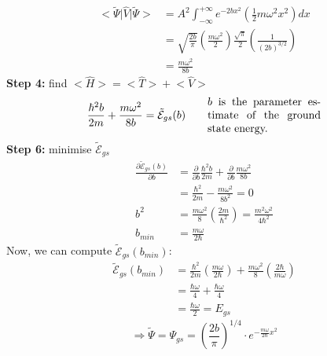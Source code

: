 \documentclass[12pt,fancychapters]{report}
\numberwithin{equation}{section}
\begin{document}
\begin{align*}
  \big<\tilde{\Psi}\big|\hat{V}\big|\tilde{\Psi}\big> &= A^2\int_{-\infty}^{+\infty}
  e^{-2bx^2}\left(\frac{1}{2} m \omega^2x^2\right)dx\\
  &= \sqrt{\frac{2b}{\pi}}\left(\frac{m\omega^2}{2}\right)\frac{\sqrt{\pi}}{2}
  \left(\frac{1}{(2b)^{3/2}}\right)\\
  &= \frac{m\omega^2}{8b}
\end{align*}
\textbf{Step 4:} find $\big<\hat{H}\big> = \big<\hat{T}\big>+\big<\hat{V}\big>$
\[
  \frac{\hbar^2 b}{2m} + \frac{m\omega^2}{8b} = \tilde{\mathcal{E}}_{gs}(b)\qquad
  \parbox{0.3\textwidth}{$b$ is the parameter estimate of the ground state energy.}
\]
\textbf{Step 6:} minimise $\tilde{\mathcal{E}}_{gs}$
\begin{align*}
  \frac{\partial \tilde{\mathcal{E}}_{gs}(b)}{\partial b} &= \frac{\partial}{\partial b}
  \frac{\hbar^2 b}{2m} + \frac{\partial }{\partial b}\frac{m\omega^2}{8b}\\
  &= \frac{\hbar^2}{2m} - \frac{m\omega^2}{8b^2} = 0\\
  b^2 &= \frac{m\omega^2}{8}\left(\frac{2m}{\hbar^2}\right) = \frac{m^2\omega^2}{4\hbar^2}\\
  b_{min} &= \frac{m\omega}{2\hbar}
\end{align*}
Now, we can compute $\tilde{\mathcal{E}}_{gs}(b_{min})$:
\begin{align*}
  \tilde{\mathcal{E}}_{gs}(b_{min})&= \frac{\hbar^2}{2m}\left(\frac{m\omega}{2\hbar}\right)
  + \frac{m\omega^2}{8}\left(\frac{2\hbar}{m\omega}\right)\\
                                   &= \frac{\hbar\omega}{4}+\frac{\hbar\omega}{4}\\
                                   &= \frac{\hbar\omega}{2} = E_{gs}
\end{align*}
\[
  \Rightarrow \boxed{\tilde{\Psi} = \Psi_{gs} = \left(\frac{2b}{\pi}\right)^{1/4} 
  \cdot e^{-\frac{m\omega}{2\hbar}x^2}}
\]
\end{document}
